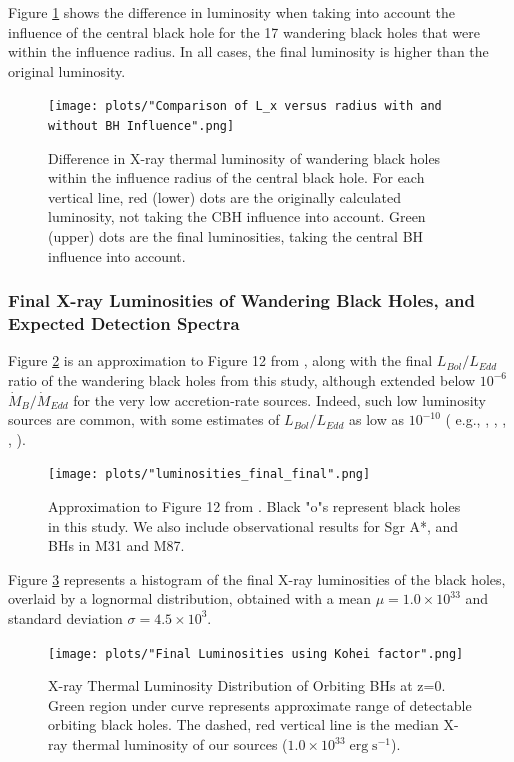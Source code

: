 \documentclass[fleqn,usenatbib,useAMS]{mnras}
\begin{document}
Figure \ref{fig:wui} shows the difference in luminosity when taking into account the influence of the central black hole for the 17 wandering black holes that were within the influence radius.  In all cases, the final luminosity is higher than the original luminosity.
\begin{figure}
\begin{center}
\texttt{[image: plots/"Comparison of L\_x versus radius with and without BH Influence".png]}
\caption{Difference in X-ray thermal luminosity of wandering black holes within the influence radius of the central black hole.  For each vertical line, red (lower) dots are the originally calculated luminosity, not taking the CBH influence into account.  Green (upper) dots are the final luminosities, taking the central BH influence into account.}
\label{fig:wui}
\end{center}
\end{figure}

\subsubsection{Final X-ray Luminosities of Wandering Black Holes, and Expected Detection Spectra}
Figure \ref{fig:loobhs} is an approximation to Figure 12 from \cite{2019MNRAS.486.5377I}, along with the final $L_{Bol}/L_{Edd}$ ratio of the wandering black holes from this study, although extended below $10^{-6}$ $\dot{M}_{B}/\dot{M}_{Edd}$ for the very low accretion-rate sources.  Indeed, such low luminosity sources are common, with some estimates of $L_{Bol}/L_{Edd}$ as low as $10^{-10}$ ( e.g., \citealt{2003ApJ...598..301Y}, \citealt{2004ApJ...613..322Q}, \citealt{2008ARA&A..46..475H}, \citealt{2009ApJ...699..626H}, \citealt{2018MNRAS.476.1412I}).
\begin{figure}
\begin{center}
\texttt{[image: plots/"luminosities\_final\_final".png]}
\caption{Approximation to Figure 12 from \citealt{2019MNRAS.486.5377I}. Black "o"s represent black holes in this study.  We also include observational results for Sgr A*, and BHs in M31 and M87.}
\label{fig:loobhs}
\end{center}
\end{figure}

Figure \ref{fig:ldobhs} represents a histogram of the final X-ray luminosities of the black holes, overlaid by a lognormal distribution, obtained with a mean $\mu=1.0\times10^{33}$ and standard deviation $\sigma=4.5\times10^{3}$.
\begin{figure}
\begin{center}
\texttt{[image: plots/"Final Luminosities using Kohei factor".png]}
\caption{X-ray Thermal Luminosity Distribution of Orbiting BHs at z=0.  Green region under curve represents approximate range of detectable orbiting black holes. The dashed, red vertical line is the median X-ray thermal luminosity of our sources ($1.0\times10^{33}\;\text{erg}\;\text{s}^{-1}$).}
\label{fig:ldobhs}
\end{center}
\end{figure}
\end{document}
